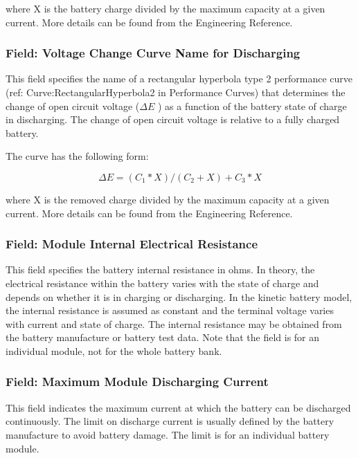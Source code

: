 where X is the battery charge divided by the maximum capacity at a given current. More details can be found from the Engineering Reference.

\subsubsection{Field: Voltage Change Curve Name for Discharging}\label{field-voltage-change-curve-name-for-discharging}

This field specifies the name of a rectangular hyperbola type 2 performance curve (ref: Curve:RectangularHyperbola2 in Performance Curves) that determines the change of open circuit voltage (\(\Delta E\) ) as a function of the battery state of charge in discharging. The change of open circuit voltage is relative to a fully charged battery.

The curve has the following form:

\begin{equation}
\Delta E = ({C_1}*X)/({C_2} + X) + {C_3}*X
\end{equation}

where X is the removed charge divided by the maximum capacity at a given current. More details can be found from the Engineering Reference.

\subsubsection{Field: Module Internal Electrical Resistance}\label{field-module-internal-electrical-resistance}

This field specifies the battery internal resistance in ohms. In theory, the electrical resistance within the battery varies with the state of charge and depends on whether it is in charging or discharging. In the kinetic battery model, the internal resistance is assumed as constant and the terminal voltage varies with current and state of charge. The internal resistance may be obtained from the battery manufacture or battery test data. Note that the field is for an individual module, not for the whole battery bank.

\subsubsection{Field: Maximum Module Discharging Current}\label{field-maximum-module-discharging-current}

This field indicates the maximum current at which the battery can be discharged continuously. The limit on discharge current is usually defined by the battery manufacture to avoid battery damage. The limit is for an individual battery module.

